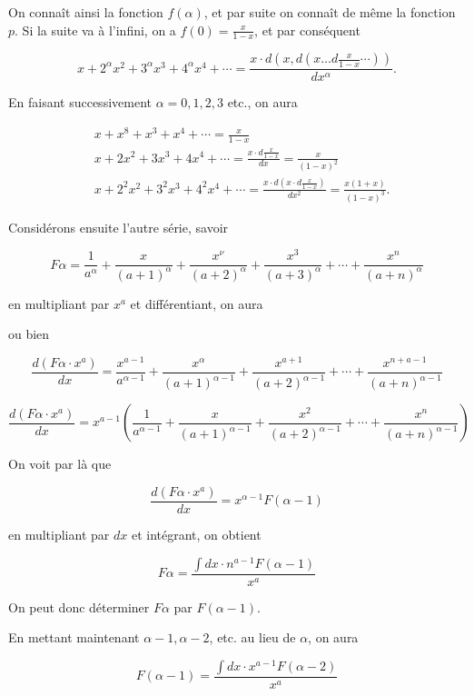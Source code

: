 \documentclass{article}
\begin{document}
On connaît ainsi la fonction \(f(\alpha)\), et par suite on connaît de même la fonction \(p\). Si la suite va à l'infini, on a \(f(0)=\frac{x}{1-x}\), et par conséquent

\[
x+2^{\alpha} x^{2}+3^{\alpha} x^{3}+4^{\alpha} x^{4}+\cdots=\frac{x \cdot d\left(x, d\left(x \ldots d \frac{x}{1-x} \cdots\right)\right)}{d x^{\alpha}} .
\]

En faisant successivement \(\alpha=0,1,2,3\) etc., on aura

\[
\begin{aligned}
& x+x^{8}+x^{3}+x^{4}+\cdots=\frac{x}{1-x} \\
& x+2 x^{2}+3 x^{3}+4 x^{4}+\cdots=\frac{x \cdot d \frac{x}{1-x}}{d x}=\frac{x}{(1-x)^{2}} \\
& x+2^{2} x^{2}+3^{2} x^{3}+4^{2} x^{4}+\cdots=\frac{x \cdot d\left(x \cdot d \frac{x}{1-x}\right)}{d x^{2}}=\frac{x(1+x)}{(1-x)^{3}} .
\end{aligned}
\]

Considérons ensuite l'autre série, savoir

\[
F \alpha=\frac{1}{a^{\alpha}}+\frac{x}{(a+1)^{\alpha}}+\frac{x^{\nu}}{(a+2)^{\alpha}}+\frac{x^{3}}{(a+3)^{\alpha}}+\cdots+\frac{x^{n}}{(a+n)^{\alpha}}
\]

en multipliant par \(x^{a}\) et différentiant, on aura

ou bien

\[
\frac{d\left(F \alpha \cdot x^{a}\right)}{d x}=\frac{x^{a-1}}{a^{\alpha-1}}+\frac{x^{\alpha}}{(a+1)^{\alpha-1}}+\frac{x^{a+1}}{(a+2)^{\alpha-1}}+\cdots+\frac{x^{n+a-1}}{(a+n)^{\alpha-1}}
\]

\[
\frac{d\left(F \alpha \cdot x^{a}\right)}{d x}=x^{a-1}\left(\frac{1}{a^{\alpha-1}}+\frac{x}{(a+1)^{\alpha-1}}+\frac{x^{2}}{(a+2)^{\alpha-1}}+\cdots+\frac{x^{n}}{(a+n)^{\alpha-1}}\right)
\]

On voit par là que

\[
\frac{d\left(F \alpha \cdot x^{a}\right)}{d x}=x^{\alpha-1} F(\alpha-1)
\]

en multipliant par \(d x\) et intégrant, on obtient

\[
F \alpha=\frac{\int d x \cdot n^{a-1} F(\alpha-1)}{x^{a}}
\]

On peut donc déterminer \(F \alpha\) par \(F(\alpha-1)\).

En mettant maintenant \(\alpha-1, \alpha-2\), etc. au lieu de \(\alpha\), on aura

\[
F(\alpha-1)=\frac{\int d x \cdot x^{a-1} F(\alpha-2)}{x^{a}}
\]
\end{document}
